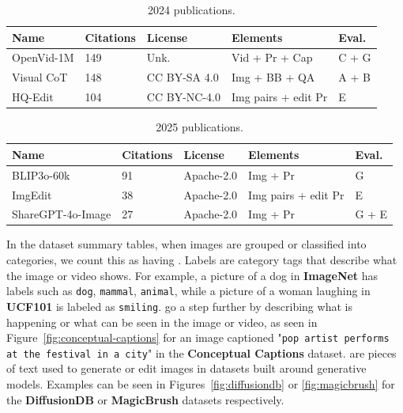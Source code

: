\documentclass{article}
\begin{document}
\begin{table}[H]
\centering
\caption{2024 publications.}
\begin{tabular}{p{2.5cm}p{1.65cm}p{3.05cm}p{3.2cm}p{2.15cm}}
\hline
\textbf{Name} & \textbf{Citations} & \textbf{License} & \textbf{Elements} & \textbf{Eval.}\\
\hline
OpenVid-1M & 149 & Unk. & Vid + Pr + Cap & C + G\\
\hline
Visual CoT & 148 & CC BY-SA 4.0 & Img + BB + QA & A + B\\
\hline
HQ-Edit & 104 & CC BY-NC-4.0 & Img pairs + edit Pr & E\\
\hline

\end{tabular}
\end{table}

\begin{table}[H]
\centering
\caption{2025 publications.}
\begin{tabular}{p{2.5cm}p{1.65cm}p{3.05cm}p{3.2cm}p{2.15cm}}
\hline
\textbf{Name} & \textbf{Citations} & \textbf{License} & \textbf{Elements} & \textbf{Eval.}\\
\hline
BLIP3o-60k & 91 & Apache-2.0 & Img + Pr & G\\
\hline
ImgEdit & 38 & Apache-2.0 & Img pairs + edit Pr & E\\
\hline
ShareGPT-4o-Image & 27 & Apache-2.0 & Img + Pr & G + E\\
\hline
\end{tabular}
\end{table}


In the dataset summary tables, when images are grouped or classified into categories, we count this as having . Labels are category tags that describe what the image or video shows. For example, a picture of a dog in \textbf{ImageNet} has labels such as \texttt{dog}, \texttt{mammal}, \texttt{animal}, while a picture of a woman laughing in \textbf{UCF101} is labeled as \texttt{smiling}.   go a step further by describing what is happening or what can be seen in the image or video, as seen in Figure~\ref{fig:conceptual-captions} for an image captioned "\texttt{pop artist performs at the festival in a city}" in the \textbf{Conceptual Captions} dataset. are pieces of text used to generate or edit images in datasets built around generative models. Examples can be seen in Figures~\ref{fig:diffusiondb} or \ref{fig:magicbrush} for the \textbf{DiffusionDB} or \textbf{MagicBrush} datasets respectively.\\
\end{document}
